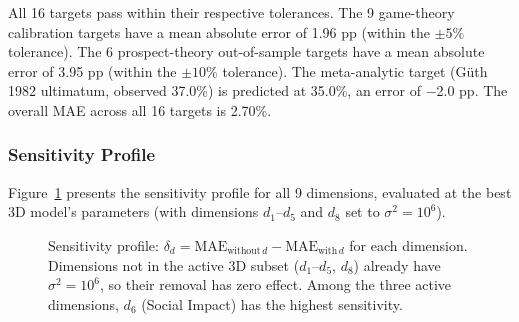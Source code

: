 \documentclass[manuscript,review,anonymous]{acmart}
\newcommand{\MAE}{\mathrm{MAE}}
\begin{document}
All 16 targets pass within their respective tolerances.
The 9 game-theory calibration targets have a mean absolute error of 1.96 pp (within the $\pm 5\%$ tolerance).
The 6 prospect-theory out-of-sample targets have a mean absolute error of 3.95 pp (within the $\pm 10\%$ tolerance).
The meta-analytic target (G\"{u}th 1982 ultimatum, observed 37.0\%) is predicted at 35.0\%, an error of $-$2.0 pp.
The overall MAE across all 16 targets is 2.70\%.

\subsubsection{Sensitivity Profile}

Figure~\ref{fig:sensitivity} presents the sensitivity profile for all 9 dimensions, evaluated at the best 3D model's parameters (with dimensions $d_1$--$d_5$ and $d_8$ set to $\sigma^2 = 10^6$).

\begin{figure}[t]
\centering
{}
\caption{Sensitivity profile: $\delta_d = \MAE_{\text{without}\,d} - \MAE_{\text{with}\,d}$ for each dimension. Dimensions not in the active 3D subset ($d_1$--$d_5$, $d_8$) already have $\sigma^2 = 10^6$, so their removal has zero effect. Among the three active dimensions, $d_6$ (Social Impact) has the highest sensitivity.}
\label{fig:sensitivity}
\end{figure}
\end{document}
